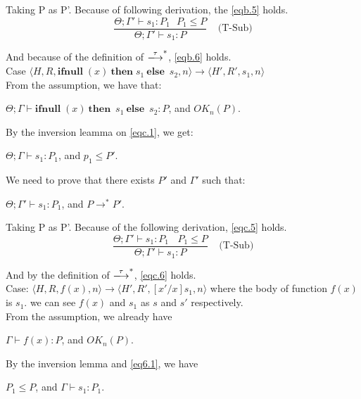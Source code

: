 \documentclass[english]{jssst_ppl} %
\newcommand\Rtab{\; \; \; \;}
\newcommand\IFNULL{\mathbf{ifnull}\;}
\newcommand\THEN{\mathbf{then}\;}
\newcommand\ELSE{\mathbf{else}\;}
\newcommand\Cirx{(x)}
\theoremstyle{definition}
\begin{document}
Taking P as P'. Because of  following derivation, the \eqref{eqb.5} holds.
$$
   \frac{\Theta; \Gamma' \vdash s_{1} : P_{1} \ \ \ P_{1} \le P}
   {\Theta; \Gamma' \vdash s_{1} : P}
   \Rtab \mbox{(T-Sub)}
$$

And because of the definition of $\xlongrightarrow{\tau}^{*}$, \eqref{eqb.6} holds. \\

\noindent Case $\langle H, R, \IFNULL \Cirx \  \THEN s_{1} \  \ELSE \  s_{2}, n \rangle \rightarrow \langle H', R',s_{1}, n \rangle $\\

From the assumption, we have that:
\begin{center}
$\Theta; \Gamma \vdash \IFNULL \Cirx \  \THEN \  s_{1} \ \ELSE \ s_{2} : P$, and $OK_{n}(P)$.
\end{center}

By the inversion leamma on \eqref{eqc.1}, we get:
\begin{center}
$\Theta; \Gamma \vdash s_{1} : P_{1}$, and $ p_{1} \le P'$.
\end{center}

We need to prove that there exists $P'$ and $\Gamma'$ such that:
\begin{center}
 $\Theta; \Gamma' \vdash s_{1} : P_{1}$, and $P \rightarrow^{*} P'$.
\end{center}

Taking P as P'. Because of the following derivation, \eqref{eqc.5} holds.
$$
  \frac{\Theta; \Gamma' \vdash s_{1} : P_{1} \ \ \ \ P_{1} \le P}
  {\Theta; \Gamma' \vdash s_{1} : P}
  \Rtab \mbox{(T-Sub)}
$$

And by the definition of $\xlongrightarrow{\tau}^{*}$, \eqref{eqc.6} holds. \\

\noindent Case: $\langle H, R, f(x) , n \rangle \rightarrow  \langle H', R', [x'/x]s_{1}, n  \rangle $ where the body of function $f(x)$ is $s_{1}$. we can see $f(x)$ and $s_{1}$ as $s$ and $s'$ respectively. \\

From the assumption, we already have
\begin{center}
$\Gamma \vdash f(x) : P$, and $OK_{n}(P)$.
\end{center}

By the inversion lemma and \eqref{eq6.1}, we have
\begin{center}
$P_{1} \le P$, and $\Gamma \vdash s_{1} : P_{1}$.
\end{center}
\end{document}
